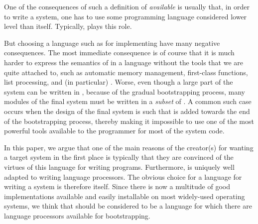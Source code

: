 One of the consequences of such a definition of \emph{available} is
usually that, in order to write a \commonlisp{} system, one has to use
some programming language considered lower level than \commonlisp{}
itself.  Typically, \clanguage{} \cite{iso:c} plays this role.

But choosing a language such as \clanguage{} for implementing
\commonlisp{} have many negative consequences.  The most immediate
consequence is of course that it is much harder to express the
semantics of \commonlisp{} in a language without the tools that we are
quite attached to, such as automatic memory management, first-class
functions, list processing, and (in particular) \clos{}.  Worse, even
though a large part of the system can be written in \commonlisp{},
because of the gradual bootstrapping process, many modules of the
final system must be written in a \emph{subset} of \commonlisp{}.  A
common such case occurs when the design of the final system is such
that \clos{} is added towards the end of the bootstrapping process,
thereby making it impossible to use one of the most powerful tools
available to the programmer for most of the system code.

In this paper, we argue that one of the main reasons of the creator(s)
for wanting a target \commonlisp{} system in the first place is
typically that they are convinced of the virtues of this language for
writing programs.  Furthermore, \commonlisp{} is uniquely well adapted
to writing language processors.  The obvious choice for a language for
writing a \commonlisp{} system is therefore \commonlisp{} itself.
Since there is now a multitude of good \commonlisp{} implementations
available and easily installable on most widely-used operating
systems, we think that \commonlisp{} should be considered to be a
language for which there are language processors available for
bootstrapping.
